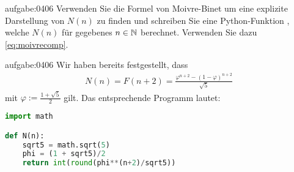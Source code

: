 \begin{aufgabe}{aufgabe:0406}
Verwenden Sie die Formel von Moivre-Binet um eine explizite Darstellung von $N(n)$ zu finden und schreiben Sie eine Python-Funktion , welche $N(n)$ für gegebenes $n\in\mathbb{N}$ berechnet. Verwenden Sie dazu \cref{eq:moivrecomp}.
\end{aufgabe}
\begin{antwort}{aufgabe:0406}
Wir haben bereits festgestellt, dass
\begin{align*}
    N(n) = F(n+2) = \frac{\varphi^{n+2}-(1-\varphi)^{n+2}}{\sqrt{5}}
\end{align*}
mit $\varphi := \frac{1+\sqrt{5}}{2}$ gilt. Das entsprechende Programm lautet:
\begin{lstlisting}[language=Python]
import math

def N(n):
    sqrt5 = math.sqrt(5)
    phi = (1 + sqrt5)/2
    return int(round(phi**(n+2)/sqrt5))
\end{lstlisting}
\end{antwort}

\clearpage
\shipoutAnswer